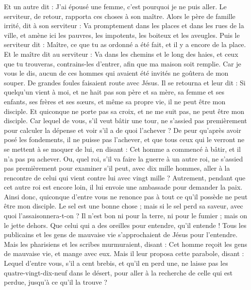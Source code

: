\begin{multicols}{2}
Et un autre dit : J’ai épousé une femme, c'est pourquoi je ne puis aller.
Le serviteur, de retour, rapporta ces choses à son maître. Alors le père de famille irrité, dit à son serviteur : Va promptement dans les places et dans les rues de la ville, et amène ici les pauvres, les impotents, les boiteux et les aveugles.
Puis le serviteur dit : Maître, ce que tu as ordonné a été fait, et il y a encore de la place.
Et le maître dit au serviteur : Va dans les chemins et le long des haies, et ceux que tu trouveras, contrains-les d'entrer, afin que ma maison soit remplie.
Car je vous le dis, aucun de ces hommes qui avaient été invités ne goûtera de mon souper.
\TextTitle{[grandeur]}
De grandes foules faisaient route avec Jésus. Il se retourna et leur dit :
Si quelqu'un vient à moi, et ne hait pas son père et sa mère, sa femme et ses enfants, ses frères et ses sœurs, et même sa propre vie, il ne peut être mon disciple.
Et quiconque ne porte pas sa croix, et ne me suit pas, ne peut être mon disciple.
\TextTitle{[grandeur]}
Car lequel de vous, s’il veut bâtir une tour, ne s’assied pas premièrement pour calculer la dépense et voir s'il a de quoi l'achever ?
De peur qu'après avoir posé les fondements, il ne puisse pas l’achever, et que tous ceux qui le verront ne se mettent à se moquer de lui,
en disant : Cet homme a commencé à bâtir, et il n'a pas pu achever.
\TextTitle{[grandeur]}
Ou, quel roi, s’il va faire la guerre à un autre roi, ne s’assied pas premièrement pour examiner s’il peut, avec dix mille hommes, aller à la rencontre de celui qui vient contre lui avec vingt mille ?
Autrement, pendant que cet autre roi est encore loin, il lui envoie une ambassade pour demander la paix.
Ainsi donc, quiconque d’entre vous ne renonce pas à tout ce qu'il possède ne peut être mon disciple.
\TextTitle{[grandeur]}
Le sel est une bonne chose ; mais si le sel perd sa saveur, avec quoi l’assaisonnera-t-on ?
Il n'est bon ni pour la terre, ni pour le fumier ; mais on le jette dehors. Que celui qui a des oreilles pour entendre, qu'il entende !
\VerseOne{}Tous les publicains et les gens de mauvaise vie s'approchaient de Jésus pour l'entendre.
Mais les pharisiens et les scribes murmuraient, disant : Cet homme reçoit les gens de mauvaise vie, et mange avec eux.
\TextTitle{[grandeur]}
Mais il leur proposa cette parabole, disant :
Lequel d'entre vous, s’il a cent brebis, et qu’il en perd une, ne laisse pas les quatre-vingt-dix-neuf dans le désert, pour aller à la recherche de celle qui est perdue, jusqu'à ce qu'il la trouve ?

\end{multicols}
